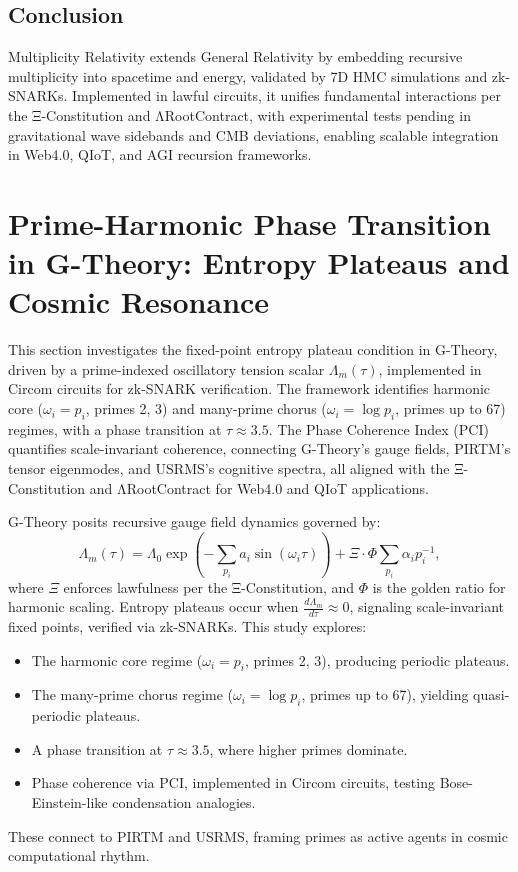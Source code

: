 \documentclass{article}
\theoremstyle{plain}
\begin{document}
\subsection{Conclusion}

Multiplicity Relativity extends General Relativity by embedding recursive multiplicity into spacetime and energy, validated by 7D HMC simulations and zk-SNARKs. Implemented in lawful circuits, it unifies fundamental interactions per the Ξ-Constitution and ΛRootContract, with experimental tests pending in gravitational wave sidebands and CMB deviations, enabling scalable integration in Web4.0, QIoT, and AGI recursion frameworks.

\section{Prime-Harmonic Phase Transition in G-Theory: Entropy Plateaus and Cosmic Resonance}

This section investigates the fixed-point entropy plateau condition in G-Theory, driven by a prime-indexed oscillatory tension scalar \( \Lambda_m(\tau) \), implemented in Circom circuits for zk-SNARK verification. The framework identifies harmonic core (\( \omega_i = p_i \), primes 2, 3) and many-prime chorus (\( \omega_i = \log p_i \), primes up to 67) regimes, with a phase transition at \( \tau \approx 3.5 \). The Phase Coherence Index (PCI) quantifies scale-invariant coherence, connecting G-Theory’s gauge fields, PIRTM’s tensor eigenmodes, and USRMS’s cognitive spectra, all aligned with the Ξ-Constitution and ΛRootContract for Web4.0 and QIoT applications.

G-Theory posits recursive gauge field dynamics governed by:
\begin{equation}
\Lambda_m(\tau) = \Lambda_0 \exp\left(-\sum_{p_i} a_i \sin(\omega_i \tau)\right) + \Xi \cdot \Phi \sum_{p_i} \alpha_i p_i^{-1},
\end{equation}
where \(\Xi\) enforces lawfulness per the Ξ-Constitution, and \(\Phi\) is the golden ratio for harmonic scaling. Entropy plateaus occur when \( \frac{d \Lambda_m}{d \tau} \approx 0 \), signaling scale-invariant fixed points, verified via zk-SNARKs. This study explores:
\begin{itemize}
    \item The harmonic core regime (\( \omega_i = p_i \), primes 2, 3), producing periodic plateaus.
    \item The many-prime chorus regime (\( \omega_i = \log p_i \), primes up to 67), yielding quasi-periodic plateaus.
    \item A phase transition at \( \tau \approx 3.5 \), where higher primes dominate.
    \item Phase coherence via PCI, implemented in Circom circuits, testing Bose-Einstein-like condensation analogies.
\end{itemize}
These connect to PIRTM and USRMS, framing primes as active agents in cosmic computational rhythm.
\end{document}
